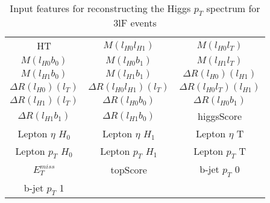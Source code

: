 \begin{table}[H]
  \begin{center}
  \begin{tabular}{ccc}
    \hline\hline
    HT & $M(l_{H0}l_{H1})$ & $M(l_{H0}l_{T})$ \\
    $M(l_{H0}b_0)$ & $M(l_{H0}b_1)$ & $M(l_{H1}l_{T})$ \\
    $M(l_{H1}b_0)$ & $M(l_{H1}b_1)$ & $\Delta R(l_{H0})(l_{H1})$ \\
    $\Delta R(l_{H0})(l_{T})$ & $\Delta R(l_{H0}l_{H1})(l_{T})$ & $\Delta R(l_{H0}l_{T})(l_{H1})$ \\
    $\Delta R(l_{H1})(l_{T})$ & $\Delta R(l_{H0}b_0)$ & $\Delta R(l_{H0}b_1)$ \\
    $\Delta R(l_{H1}b_1)$ & $\Delta R(l_{H1}b_0)$ & higgsScore \\
    Lepton  $\eta$ $H_0$ & Lepton  $\eta$ $H_1$ & Lepton  $\eta$ T \\
    Lepton  $p_T$ $H_0$ & Lepton  $p_T$ $H_1$ & Lepton  $p_T$ T \\
    $E_T^{miss}$ & topScore & b-jet $p_T$ 0 \\
    b-jet $p_T$ 1 & & \\
    \hline
  \end{tabular}
  \end{center}
  \caption{Input features for reconstructing the Higgs $p_T$ spectrum for 3lF events}
  \label{tab:pt3lFfeatures}
\end{table}
